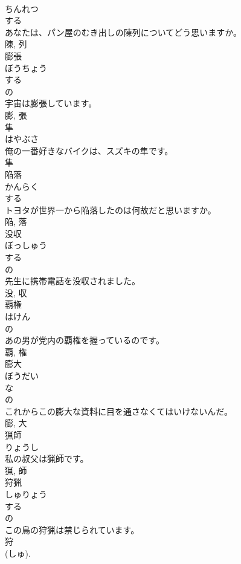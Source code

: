 \documentclass[8pt]{extreport}
\begin{document}
\begin{CJK}{UTF8}{min}
\\	ちんれつ	
\\	する 
\\	あなたは、パン屋のむき出しの陳列についてどう思いますか。	
\\	陳, 列	
\\	膨張	
\\	ぼうちょう	
\\	する 
\\	の 
\\	宇宙は膨張しています。	
\\	膨, 張	
\\	隼	
\\	はやぶさ	
\\	俺の一番好きなバイクは、スズキの隼です。	
\\	隼	
\\	陥落	
\\	かんらく	
\\	する 
\\	トヨタが世界一から陥落したのは何故だと思いますか。	
\\	陥, 落	
\\	没収	
\\	ぼっしゅう	
\\	する 
\\	の 
\\	先生に携帯電話を没収されました。	
\\	没, 収	
\\	覇権	
\\	はけん	
\\	の 
\\	あの男が党内の覇権を握っているのです。	
\\	覇, 権	
\\	膨大	
\\	ぼうだい	
\\	な 
\\	の 
\\	これからこの膨大な資料に目を通さなくてはいけないんだ。	
\\	膨, 大	
\\	猟師	
\\	りょうし	
\\	私の叔父は猟師です。	
\\	猟, 師	
\\	狩猟	
\\	しゅりょう	
\\	する 
\\	の 
\\	この鳥の狩猟は禁じられています。	
\\	狩 
\\	(しゅ). 

\end{CJK}
\end{document}
